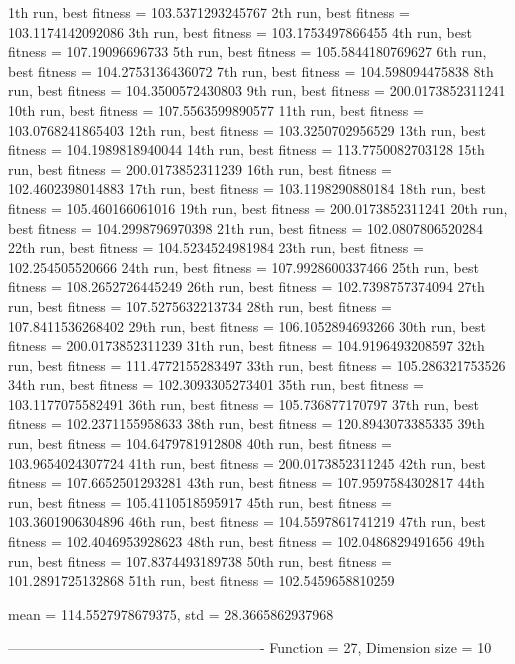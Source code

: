 1th run, best fitness = 103.5371293245767
2th run, best fitness = 103.1174142092086
3th run, best fitness = 103.1753497866455
4th run, best fitness = 107.19096696733
5th run, best fitness = 105.5844180769627
6th run, best fitness = 104.2753136436072
7th run, best fitness = 104.598094475838
8th run, best fitness = 104.3500572430803
9th run, best fitness = 200.0173852311241
10th run, best fitness = 107.5563599890577
11th run, best fitness = 103.0768241865403
12th run, best fitness = 103.3250702956529
13th run, best fitness = 104.1989818940044
14th run, best fitness = 113.7750082703128
15th run, best fitness = 200.0173852311239
16th run, best fitness = 102.4602398014883
17th run, best fitness = 103.1198290880184
18th run, best fitness = 105.460166061016
19th run, best fitness = 200.0173852311241
20th run, best fitness = 104.2998796970398
21th run, best fitness = 102.0807806520284
22th run, best fitness = 104.5234524981984
23th run, best fitness = 102.254505520666
24th run, best fitness = 107.9928600337466
25th run, best fitness = 108.2652726445249
26th run, best fitness = 102.7398757374094
27th run, best fitness = 107.5275632213734
28th run, best fitness = 107.8411536268402
29th run, best fitness = 106.1052894693266
30th run, best fitness = 200.0173852311239
31th run, best fitness = 104.9196493208597
32th run, best fitness = 111.4772155283497
33th run, best fitness = 105.286321753526
34th run, best fitness = 102.3093305273401
35th run, best fitness = 103.1177075582491
36th run, best fitness = 105.736877170797
37th run, best fitness = 102.2371155958633
38th run, best fitness = 120.8943073385335
39th run, best fitness = 104.6479781912808
40th run, best fitness = 103.9654024307724
41th run, best fitness = 200.0173852311245
42th run, best fitness = 107.6652501293281
43th run, best fitness = 107.9597584302817
44th run, best fitness = 105.4110518595917
45th run, best fitness = 103.3601906304896
46th run, best fitness = 104.5597861741219
47th run, best fitness = 102.4046953928623
48th run, best fitness = 102.0486829491656
49th run, best fitness = 107.8374493189738
50th run, best fitness = 101.2891725132868
51th run, best fitness = 102.5459658810259

mean = 114.5527978679375, std = 28.3665862937968

-------------------------------------------------------
Function = 27, Dimension size = 10

